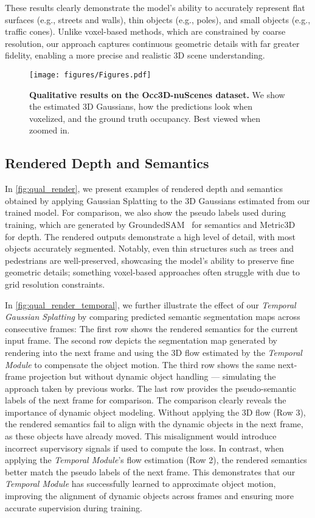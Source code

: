These results clearly demonstrate the model’s ability to accurately represent flat surfaces (e.g., streets and walls), thin objects (e.g., poles), and small objects (e.g., traffic cones).
Unlike voxel-based methods, which are constrained by coarse resolution, our approach captures continuous geometric details with far greater fidelity, enabling a more precise and realistic 3D scene understanding.

\begin{figure*}
    \centering
    \texttt{[image: figures/Figures.pdf]}
    \caption{
        \textbf{Qualitative results on the Occ3D-nuScenes dataset.}
        We show the estimated 3D Gaussians, how the predictions look when voxelized, and the ground truth occupancy.
        Best viewed when zoomed in.
    }
    \label{fig:qualitative1}
\end{figure*}

\subsection{Rendered Depth and Semantics}
In \cref{fig:qual_render}, we present examples of rendered depth and semantics obtained by applying Gaussian Splatting to the 3D Gaussians estimated from our trained model.
For comparison, we also show the pseudo labels used during training, which are generated by GroundedSAM~\cite{ren2024grounded} for semantics and Metric3D~\cite{yin2023metric3d} for depth.
The rendered outputs demonstrate a high level of detail, with most objects accurately segmented.
Notably, even thin structures such as trees and pedestrians are well-preserved, showcasing the model's ability to preserve fine geometric details; something voxel-based approaches often struggle with due to grid resolution constraints.

In \cref{fig:qual_render_temporal}, we further illustrate the effect of our \emph{Temporal Gaussian Splatting} by comparing predicted semantic segmentation maps across consecutive frames:
The first row shows the rendered semantics for the current input frame.
The second row depicts the segmentation map generated by rendering into the next frame and using the 3D flow estimated by the \emph{Temporal Module} to compensate the object motion.
The third row shows the same next-frame projection but without dynamic object handling — simulating the approach taken by previous works.
The last row provides the pseudo-semantic labels of the next frame for comparison.
The comparison clearly reveals the importance of dynamic object modeling.
Without applying the 3D flow (Row 3), the rendered semantics fail to align with the dynamic objects in the next frame, as these objects have already moved.
This misalignment would introduce incorrect supervisory signals if used to compute the loss.
In contrast, when applying the \emph{Temporal Module}’s flow estimation (Row 2), the rendered semantics better match the pseudo labels of the next frame.
This demonstrates that our \emph{Temporal Module} has successfully learned to approximate object motion, improving the alignment of dynamic objects across frames and ensuring more accurate supervision during training.

